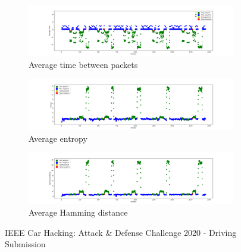 \begin{figure}
    \centering
    \begin{subfigure}[b]{\linewidth}
        \includegraphics[width = \linewidth]{img/parts/app/tests/ieee/driving/AvgTime.png}
        \caption{Average time between packets}
        \label{subfig:extract_ieee_d_avgtime}
    \end{subfigure}
    \begin{subfigure}[b]{\linewidth}
        \includegraphics[width = \linewidth]{img/parts/app/tests/ieee/driving/Entropy.png}
        \caption{Average entropy}
        \label{subfig:extract_ieee_d_entropy}
    \end{subfigure}
    \begin{subfigure}[b]{\linewidth}
        \includegraphics[width = \linewidth]{img/parts/app/tests/ieee/driving/HammingDist.png}
        \caption{Average Hamming distance}
        \label{subfig:extract_ieee_d_hammingdist}
    \end{subfigure}
    \caption{IEEE Car Hacking: Attack \& Defense Challenge 2020 - Driving Submission}
    \label{fig:extract_ieee_d}
\end{figure}


